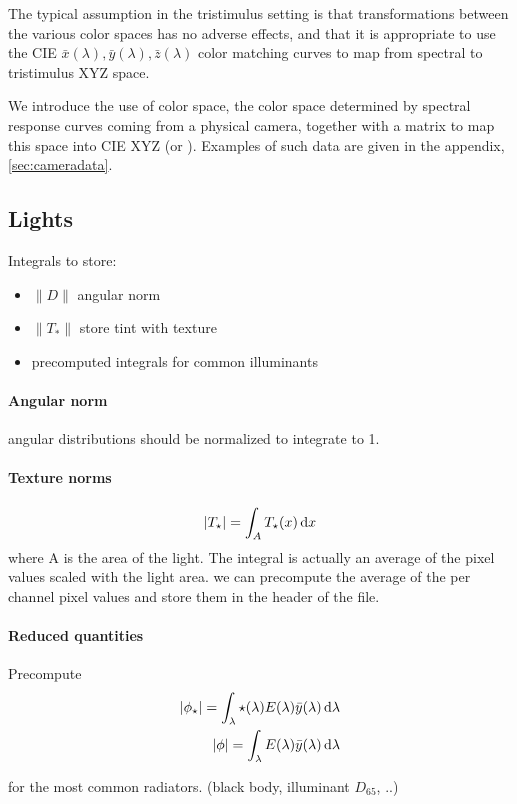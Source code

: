 The typical assumption in the tristimulus setting is that transformations
between the various color spaces has no adverse effects, and that it is
appropriate to use the \gls{CIE} $\bar x(\lambda), \bar y(\lambda), \bar z(\lambda)$
color matching curves to map from spectral to tristimulus \gls{XYZ} space.

We introduce the use of  color space, the color space
determined by spectral response curves coming from a physical camera, together
with a matrix to map this space into \gls{CIE} \gls{XYZ} (or \sRGBl). Examples
of such data are given in the appendix, \cref{sec:cameradata}.


\subsection{Lights}

\begin{inconstruction}

Integrals to store:
\begin{itemize}
\item $\|D\|$ angular norm
\item $\|T_*\|$ store tint with texture
\item precomputed integrals for common illuminants
\end{itemize}

\paragraph{Angular norm}
angular distributions should be normalized to integrate to 1.

\paragraph{Texture norms}
\begin{displaymath}
|T_\star| = \int_A T_\star(x) \mathop{}\!\mathrm{d} x
\end{displaymath}
where A is the area of the light. The integral is actually an average of the
pixel values scaled with the light area. we can precompute the average of the
per channel pixel values and store them in the header of the file.

\paragraph{Reduced quantities}

Precompute
\begin{align*}
|\phi_\star| = \int_\lambda \star(\lambda) E(\lambda) \bar y(\lambda) \d\lambda\\
|\phi| = \int_\lambda E(\lambda) \bar y(\lambda) \d\lambda\\
\end{align*}

for the most common radiators. (black body, illuminant $D_{65}$, ..)

\end{inconstruction}


